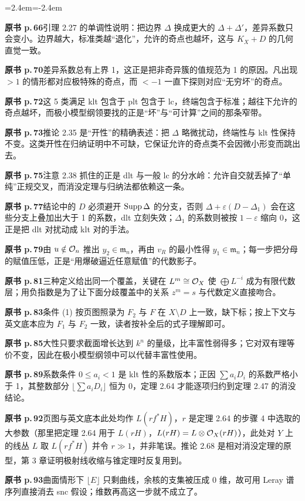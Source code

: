 \begin{list}{}{\leftmargin=2.4em\itemindent=-2.4em\itemsep=2pt\parsep=0pt}
\item \textbf{原书 p.\,66}\quad 引理 2.27 的单调性说明：把边界 $\Delta$ 换成更大的 $\Delta+\Delta'$，差异系数只会变小。边界越大，标准类越“退化”，允许的奇点也越坏，这与 $K_X+D$ 的几何直觉一致。
\item \textbf{原书 p.\,70}\quad 差异系数总有上界 1，这正是把非奇异簇的值规范为 1 的原因。凡出现 $>1$ 的情形都对应极特殊的奇点，而 $<-1$ 一直下探则对应“无穷坏”的奇点。
\item \textbf{原书 p.\,72}\quad 这 5 类满足 klt 包含于 plt 包含于 lc，终端包含于标准；越往下允许的奇点越坏，而极小模型纲领要找的正是“坏”与“可计算”之间的那条窄带。
\item \textbf{原书 p.\,73}\quad 推论 2.35 是“开性”的精确表述：把 $\Delta$ 略微扰动，终端性与 klt 性保持不变。这类开性在归纳证明中不可缺，它保证允许的奇点类不会因微小形变而跳出去。
\item \textbf{原书 p.\,75}\quad 注意 2.38 抓住的正是 dlt 与一般 lc 的分水岭：允许自交就丢掉了“单纯”正规交叉，而消没定理与归纳法都依赖这一条。
\item \textbf{原书 p.\,77}\quad 结论中的 $D$ 必须避开 $\operatorname{Supp}\Delta$ 的分支，否则 $\Delta+\varepsilon(D-\Delta_1)$ 会在这些分支上叠加出大于 1 的系数，dlt 立刻失效；$\Delta_1$ 的系数则被按 $1-\varepsilon$ 缩向 0，这正是把 dlt 对扰动成 klt 对的手法。
\item \textbf{原书 p.\,79}\quad 由 $u\notin\mathcal{O}_n$ 推出 $y_2\in\mathfrak m_n$，再由 $v_R$ 的最小性得 $y_1\in\mathfrak m_n$；每一步把分母的赋值压低，正是“用爆破逼近任意赋值”的代数影子。
\item \textbf{原书 p.\,81}\quad 三种定义给出同一个覆盖，关键在 $L^m\cong\mathcal{O}_X$ 使 $\bigoplus L^{-i}$ 成为有限代数层；用负指数是为了让下面分歧覆盖中的关系 $z^m=s$ 与代数定义直接吻合。
\item \textbf{原书 p.\,83}\quad 条件 (1) 按页图照录为 $F_2$ 与 $F$ 在 $X\setminus D$ 上一致，缺下标；按上下文与英文底本应为 $F_1$ 与 $F_2$ 一致，读者按补全后的式子理解即可。
\item \textbf{原书 p.\,85}\quad 大性只要求截面增长达到 $k^n$ 的量级，比丰富性弱得多；它对双有理等价不变，因此在极小模型纲领中可以代替丰富性使用。
\item \textbf{原书 p.\,89}\quad 系数条件 $0\le a_i<1$ 是 klt 性的系数版本；正因 $\sum a_iD_i$ 的系数严格小于 1，其整数部分 $\lfloor\sum a_iD_i\rfloor$ 恒为 0，定理 2.64 才能逐项归约到定理 2.47 的消没结论。
\item \textbf{原书 p.\,92}\quad 页图与英文底本此处均作 $L(rf^*H)$，$r$ 是定理 2.64 的步骤 4 中选取的大参数（那里把定理 2.64 用于 $L(rH)$，$L(rH)=L\otimes\mathcal{O}_X(rH)$），此处对 $Y$ 上的线丛 $L$ 取 $L(rf^*H)$ 并令 $r\gg1$，并非笔误。推论 2.68 是相对消没定理的原型，第 3 章证明极射线收缩与锥定理时反复用到。
\item \textbf{原书 p.\,93}\quad 曲面情形下 $\lfloor E\rfloor$ 只剩曲线，余核的支集被压成 0 维，故可用 Leray 谱序列直接消去 snc 假设；维数再高这一步就不成立了。
\end{list}

